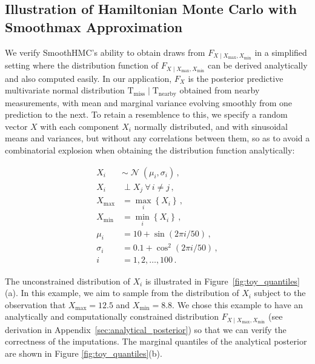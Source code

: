 \documentclass[letter]{article}
\newcommand{\genericdel}[3]{%
      \left#1#3\right#2
    }
\newcommand{\del}[1]{\genericdel(){#1}}
\newcommand{\cbr}[1]{\genericdel\{\}{#1}}
\DeclareMathOperator{\normal}{\mathcal{N}}
\newcommand{\T}{\mathrm{T}}
\newcommand{\indep}{\perp}
\newcommand{\miss}{\mathrm{miss}}
\newcommand{\obs}{\mathrm{nearby}}
\newcommand{\Xmax}{X_{\max}}
\newcommand{\Xmin}{X_{\min}}
\newcommand{\Fcond}{F_{X \mid \Xmax,\Xmin}}
\newcommand{\eqlabel}[1]{\label{#1}}
\begin{document}
        \subsection{Illustration of Hamiltonian Monte Carlo with Smoothmax Approximation}\label{illustration-of-hamiltonian-monte-carlo-with-smoothmax-approximation}
    

\label{sec:toy_example}
        We verify SmoothHMC's ability to obtain draws from \(\Fcond\) in a simplified setting where the distribution function of \(\Fcond\) can be derived analytically and also computed easily.
In our application, \(F_X\) is the posterior predictive multivariate normal distribution \(\T_\miss \mid \T_\obs\) obtained from nearby measurements, with mean and marginal variance evolving smoothly from one prediction to the next.
To retain a resemblence to this, we specify a random vector \(X\) with each component \(X_i\) normally distributed, and with sinusoidal means and variances, but without any correlations between them,
so as to avoid a combinatorial explosion when obtaining the distribution function analytically:

\begin{equation}
\begin{split}
X_i &\sim \normal \del{\mu_i, \sigma_i} \,, \\
X_i & \indep X_j ~\forall\, i \neq j \,, \\
\Xmax &= \max_i\cbr{X_i} \,, \\
\Xmin &= \min_i\cbr{X_i} \,,\\
\mu_i &= 10 + \sin\del{2\pi i / 50} \,, \\
\sigma_i &= 0.1+\cos^2\del{2\pi i / 50} \,, \\
i &= 1, 2, \ldots, 100 \,.
\end{split}
\eqlabel{eq:toyspec}
\end{equation}

The unconstrained distribution of \(X_i\) is illustrated in Figure~\ref{fig:toy_quantiles}(a).
In this example, we aim to sample from the distribution of \(X_i\) subject to the observation that \(\Xmax=12.5\) and \(\Xmin=8.8\).
We chose this example to have an analytically and computationally constrained distribution \(\Fcond\) (see derivation in Appendix~\ref{sec:analytical_posterior}) so that we can verify the correctness of the imputations.
The marginal quantiles of the analytical posterior are shown in Figure \ref{fig:toy_quantiles}(b).
    
\end{document}
